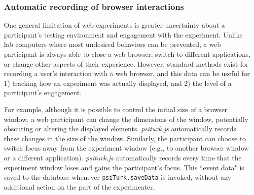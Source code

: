 \documentclass[twocolumn]{svjour3}          %
\begin{document}
\subsubsection{Automatic recording of browser interactions}
 
One general limitation of web experiments is greater uncertainty about a participant's testing environment and engagement with the experiment.
Unlike lab computers where most undesired behaviors can be prevented, a web participant is always able to close a web browser, switch to different applications, or change other aspects of their experience.
However, standard methods exist for recording a user's interaction with a web browser, and this data can be useful for 1) tracking how an experiment was actually displayed, and 2) the level of a participant's engagement.

For example, although it is possible to control the initial size of a browser window, a web participant can change the dimensions of the window, potentially obscuring or altering the displayed elements.
\emph{psiturk.js} automatically records these changes in the size of the window.
Similarly, the participant can choose to switch focus away from the experiment window (e.g., to another browser window or a different application).
\emph{psiturk.js} automatically records every time that the experiment window loses and gains the participant's focus.
This ``event data" is saved to the database whenever \texttt{psiTurk.saveData} is invoked, without any additional action on the part of the experimenter. \\
\end{document}
